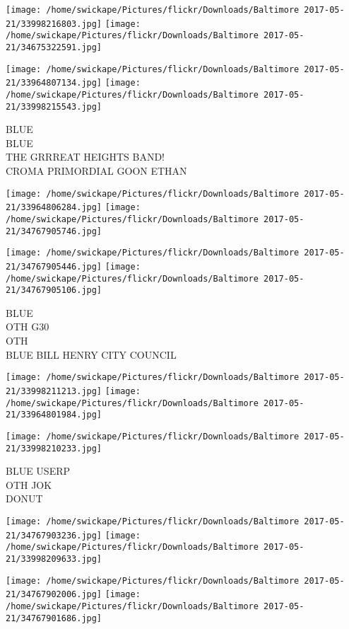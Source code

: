 \documentclass[10pt,letterpaper]{article}
\begin{document}
\texttt{[image: /home/swickape/Pictures/flickr/Downloads/Baltimore 2017-05-21/33998216803.jpg]}
\texttt{[image: /home/swickape/Pictures/flickr/Downloads/Baltimore 2017-05-21/34675322591.jpg]}

\texttt{[image: /home/swickape/Pictures/flickr/Downloads/Baltimore 2017-05-21/33964807134.jpg]}
\texttt{[image: /home/swickape/Pictures/flickr/Downloads/Baltimore 2017-05-21/33998215543.jpg]}

BLUE\\
BLUE\\
THE GRRREAT HEIGHTS BAND!\\
CROMA PRIMORDIAL GOON ETHAN\\
\pagebreak

\texttt{[image: /home/swickape/Pictures/flickr/Downloads/Baltimore 2017-05-21/33964806284.jpg]}
\texttt{[image: /home/swickape/Pictures/flickr/Downloads/Baltimore 2017-05-21/34767905746.jpg]}

\texttt{[image: /home/swickape/Pictures/flickr/Downloads/Baltimore 2017-05-21/34767905446.jpg]}
\texttt{[image: /home/swickape/Pictures/flickr/Downloads/Baltimore 2017-05-21/34767905106.jpg]}

BLUE\\
OTH G30\\
OTH\\
BLUE BILL HENRY CITY COUNCIL\\
\pagebreak

\texttt{[image: /home/swickape/Pictures/flickr/Downloads/Baltimore 2017-05-21/33998211213.jpg]}
\texttt{[image: /home/swickape/Pictures/flickr/Downloads/Baltimore 2017-05-21/33964801984.jpg]}

\vspace{0.25in}
\texttt{[image: /home/swickape/Pictures/flickr/Downloads/Baltimore 2017-05-21/33998210233.jpg]}

BLUE USERP\\
OTH JOK\\
DONUT\\
\pagebreak

\texttt{[image: /home/swickape/Pictures/flickr/Downloads/Baltimore 2017-05-21/34767903236.jpg]}
\texttt{[image: /home/swickape/Pictures/flickr/Downloads/Baltimore 2017-05-21/33998209633.jpg]}

\texttt{[image: /home/swickape/Pictures/flickr/Downloads/Baltimore 2017-05-21/34767902006.jpg]}
\texttt{[image: /home/swickape/Pictures/flickr/Downloads/Baltimore 2017-05-21/34767901686.jpg]}
\end{document}
